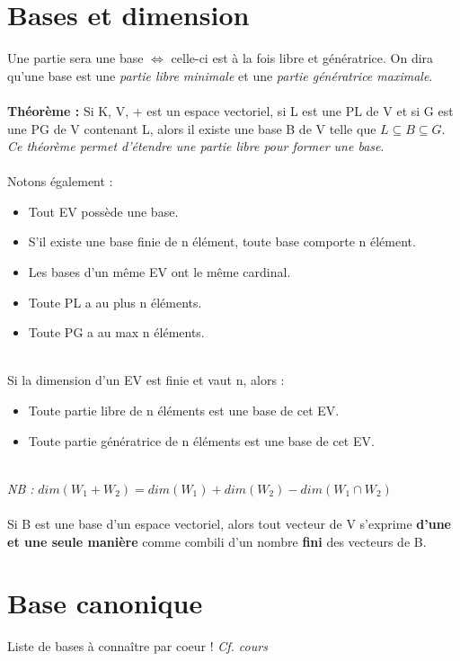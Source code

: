 \documentclass[11pt, a4paper, openany]{book}
\begin{document}
	\section{Bases et dimension}
	Une partie sera une base $\Leftrightarrow$ celle-ci est à la fois libre et génératrice. On dira qu'une base est une \textit{partie libre minimale} et une \textit{partie génératrice maximale}.\\\\
	\textbf{Théorème :} Si K, V, + est un espace vectoriel, si L est une PL de V et si G est une PG de V contenant L, alors il existe une base B de V telle que $L \subseteq B \subseteq G$.\\
	\textit{Ce théorème permet d'étendre une partie libre pour former une base}.\\\\
	Notons également :
	\begin{itemize}
		\item Tout EV possède une base.
		\item S'il existe une base finie de n élément, toute base comporte n élément.
		\item Les bases d'un même EV ont le même cardinal.
		\item Toute PL a au plus n éléments.
		\item Toute PG a au max n éléments.
	\end{itemize}
	\ \\
	Si la dimension d'un EV est finie et vaut n, alors :
	\begin{itemize}
		\item Toute partie libre de n éléments est une base de cet EV.
		\item Toute partie génératrice de n éléments est une base de cet EV.
	\end{itemize}
	\ \\
	\textit{NB :} $dim(W_{1} + W_{2}) = dim(W_{1}) + dim(W_{2}) - dim(W_{1} \cap W_{2})$\\\\
	Si B est une base d'un espace vectoriel, alors tout vecteur de V s'exprime \textbf{d'une et une seule manière} comme combili d'un nombre \textbf{fini} des vecteurs de B.
	
	\section{Base canonique}
	Liste de bases à connaître par coeur ! \textit{Cf. cours}
	
\end{document}
